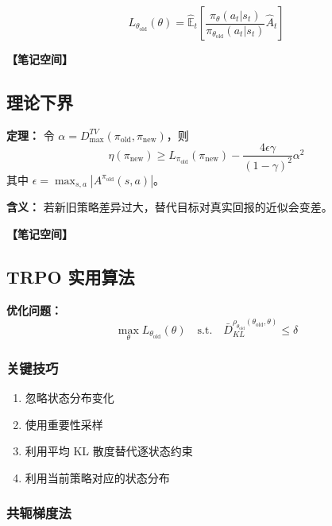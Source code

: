 \documentclass[12pt,a4paper]{article}
\newcommand{\notespace}[1][3cm]{%
  \vspace{#1}%
  \noindent\textbf{【笔记空间】}%
  \vspace{#1}%
}
\newcommand{\E}{\mathbb{E}}
\newcommand{\1}{\mathbf{1}}
\begin{document}
\begin{equation}
L_{\theta_{\text{old}}}(\theta)=\hat{\E}_t\left[\frac{\pi_\theta(a_t|s_t)}{\pi_{\theta_{\text{old}}}(a_t|s_t)}\hat{A}_t\right]
\end{equation}

\notespace[2cm]

\subsection{理论下界}

\begin{keybox}
\textbf{定理：} 令 $\alpha=D_{\max}^{TV}(\pi_{\text{old}},\pi_{\text{new}})$，则
\begin{equation}
\eta(\pi_{\text{new}})\ge L_{\pi_{\text{old}}}(\pi_{\text{new}})-\frac{4\epsilon\gamma}{(1-\gamma)^2}\alpha^2
\end{equation}
其中 $\epsilon=\max_{s,a}|A^{\pi_{\text{old}}}(s,a)|$。
\end{keybox}

\textbf{含义：} 若新旧策略差异过大，替代目标对真实回报的近似会变差。

\notespace[2cm]

\subsection{TRPO 实用算法}

\textbf{优化问题：}
\begin{equation}
\max_\theta L_{\theta_{\text{old}}}(\theta) \quad \text{s.t.} \quad \bar{D}_{KL}^{\rho_{\theta_{\text{old}}}(\theta_{\text{old}},\theta)}\le\delta
\end{equation}

\subsubsection*{关键技巧}

\begin{enumerate}[leftmargin=2em]
  \item 忽略状态分布变化
  \item 使用重要性采样
  \item 利用平均 KL 散度替代逐状态约束
  \item 利用当前策略对应的状态分布
\end{enumerate}

\subsubsection*{共轭梯度法}
\end{document}

